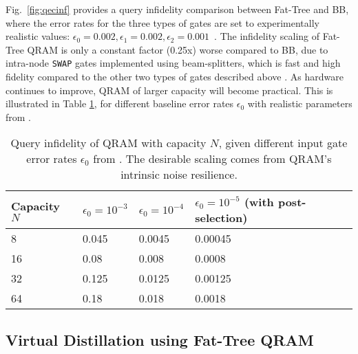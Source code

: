Fig.~\ref{fig:qecinf} provides a query infidelity comparison between Fat-Tree and BB, where the error rates for the three types of gates are set to experimentally realistic values: $\epsilon_0=0.002, \epsilon_1=0.002, \epsilon_2=0.001$~\cite{weiss2024quantum,zhong2021deterministic,niu2023low}. The infidelity scaling of Fat-Tree QRAM is only a constant factor (0.25x) worse compared to BB, due to intra-node \texttt{SWAP} gates implemented using beam-splitters, which is fast and high fidelity compared to the other two types of gates described above \cite{weiss2024quantum, chapman2023high}. As hardware continues to improve, QRAM of larger capacity will become practical. This is illustrated in Table \ref{tab:error_rates}, for different baseline error rates $\epsilon_0$ with realistic parameters from \cite{weiss2024quantum}.

\begin{table}[t]
\small
\centering
\begin{tabular}{ p{1.5cm}||p{1.5cm}|p{1.5cm}|p{2.2cm}}
\hline
Capacity $N$ & $\epsilon_0=10^{-3}$ & $\epsilon_0=10^{-4}$ & $\epsilon_0=10^{-5}$ (with post-selection) \\ \hline
8 & 0.045 & 0.0045 & 0.00045 \\ \hline
16 & 0.08 & 0.008 & 0.0008 \\ \hline
32 & 0.125 & 0.0125 & 0.00125 \\ \hline
64 & 0.18 & 0.018 & 0.0018 \\ \hline
\end{tabular}
\caption{Query infidelity of QRAM with capacity $N$, given different input gate error rates $\epsilon_0$ from \cite{weiss2024quantum}. The desirable scaling comes from QRAM's intrinsic noise resilience.}
\label{tab:error_rates}
\end{table}

\subsection{Virtual Distillation using Fat-Tree QRAM}
\label{subsec:vd}

